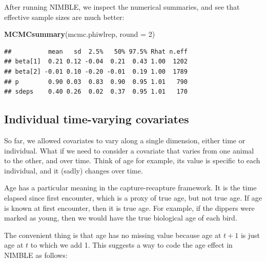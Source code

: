 \documentclass[
  12pt,
]{krantz}
\newenvironment{Shaded}{\begin{snugshade}}{\end{snugshade}}
\newcommand{\AttributeTok}[1]{\textcolor[rgb]{0.13,0.29,0.53}{#1}}
\newcommand{\DecValTok}[1]{\textcolor[rgb]{0.00,0.00,0.81}{#1}}
\newcommand{\FunctionTok}[1]{\textcolor[rgb]{0.13,0.29,0.53}{\textbf{#1}}}
\newcommand{\NormalTok}[1]{#1}
\begin{document}
After running NIMBLE, we inspect the numerical summaries, and see that effective sample sizes are much better:

\begin{Shaded}
\begin{Highlighting}[]
\FunctionTok{MCMCsummary}\NormalTok{(mcmc.phiwlrep, }\AttributeTok{round =} \DecValTok{2}\NormalTok{)}
\end{Highlighting}
\end{Shaded}

\begin{verbatim}
##          mean   sd  2.5%   50% 97.5% Rhat n.eff
## beta[1]  0.21 0.12 -0.04  0.21  0.43 1.00  1202
## beta[2] -0.01 0.10 -0.20 -0.01  0.19 1.00  1789
## p        0.90 0.03  0.83  0.90  0.95 1.01   790
## sdeps    0.40 0.26  0.02  0.37  0.95 1.01   170
\end{verbatim}

\subsection{Individual time-varying covariates}\label{agecov}

So far, we allowed covariates to vary along a single dimension, either time or individual. What if we need to consider a covariate that varies from one animal to the other, and over time. Think of age for example, its value is specific to each individual, and it (sadly) changes over time.

Age has a particular meaning in the capture-recapture framework. It is the time elapsed since first encounter, which is a proxy of true age, but not true age. If age is known at first encounter, then it is true age. For example, if the dippers were marked as young, then we would have the true biological age of each bird.

The convenient thing is that age has no missing value because age at \(t+1\) is just age at \(t\) to which we add 1. This suggests a way to code the age effect in NIMBLE as follows:
\end{document}
